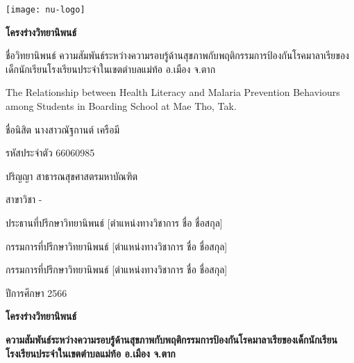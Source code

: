 \begin{titlepage}

  \begin{center}
    \texttt{[image: nu-logo]}
    
    \textbf{โครงร่างวิทยานิพนธ์}
  \end{center}
  \begin{flushleft}
   ชื่อวิทยานิพนธ์ ความสัมพันธ์ระหว่างความรอบรู้ด้านสุขภาพกับพฤติกรรมการป้องกันโรคมาลาเรียของเด็กนักเรียนโรงเรียนประจำในเขตตำบลแม่ท้อ อ.เมือง จ.ตาก

  The Relationship between Health Literacy and Malaria Prevention Behaviours among Students in Boarding School at Mae Tho, Tak.

    ชื่อนิสิต นางสาวณัฐกานต์ เครือมี

    รหัสประจำตัว  66060985

    ปริญญา	สาธารณสุขศาสตรมหาบัณฑิต

    สาขาวิชา -

    ประธานที่ปรึกษาวิทยานิพนธ์	[ตำแหน่งทางวิชาการ ชื่อ ชื่อสกุล]

    กรรมการที่ปรึกษาวิทยานิพนธ์	[ตำแหน่งทางวิชาการ ชื่อ ชื่อสกุล]

    กรรมการที่ปรึกษาวิทยานิพนธ์	[ตำแหน่งทางวิชาการ ชื่อ ชื่อสกุล]

    ปีการศึกษา	2566
  \end{flushleft}

  \newpage

  \centering\textbf{โครงร่างวิทยานิพนธ์}

  \raggedright\textbf{ความสัมพันธ์ระหว่างความรอบรู้ด้านสุขภาพกับพฤติกรรมการป้องกันโรคมาลาเรียของเด็กนักเรียนโรงเรียนประจำในเขตตำบลแม่ท้อ อ.เมือง จ.ตาก}


\end{titlepage}
